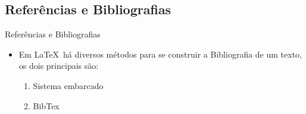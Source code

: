 \documentclass{beamer}
\begin{document}
\subsection{Referências e Bibliografias}
\begin{frame}{Referências e Bibliografias}

  \begin{itemize}
    \item Em \LaTeX\ há diversos métodos para se construir a Bibliografia de um texto, os dois principais são:
 
    \begin{enumerate}
        \item Sistema embarcado
        \item BibTex
    \end{enumerate}
  \end{itemize}

\end{frame}
\end{document}
